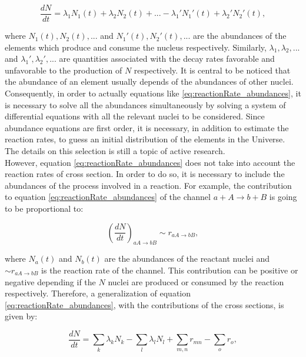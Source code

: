 \documentclass[openany]{book}
\begin{document}
 \begin{equation}\label{eq:reactionRate_abundances}
 	\frac{dN}{dt} = \lambda_1 N_1(t) + \lambda_2 N_2(t)  + ... -  \lambda_1' N_1'(t) + \lambda_2' N_2'(t),
 \end{equation}

where $N_1(t), N_2(t), ...$ and $N_1'(t), N_2'(t), ...$ are the abundances of the elements which produce and consume the nucleus respectively. Similarly,  $\lambda_1, \lambda_2, ...$ and  $\lambda_1', \lambda_2', ...$ are quantities associated with the decay rates favorable and unfavorable to the production of $N$ respectively. It is central to be noticed that the abundance of an element usually depends of the abundances of other nuclei. Consequently, in order to actually equations like \ref{eq:reactionRate_abundances}, it is necessary to solve all the abundances simultaneously by solving a system of differential equations with all the relevant nuclei to be considered. Since abundance equations are first order, it is necessary, in addition to estimate the reaction rates, to guess an initial distribution of the elements in the Universe. The details on this selection is still a topic of active research. \\

However, equation \ref{eq:reactionRate_abundances} does not take into account the reaction rates of cross section. In order to do so, it is necessary to include the abundances of the process involved in a reaction. For example, the contribution to equation \ref{eq:reactionRate_abundances} of the channel $a + A \rightarrow b + B$ is going to be proportional to: 

\begin{equation}
		\left(\frac{dN}{dt}\right)_{aA \rightarrow bB} \sim r_{aA \rightarrow bB},
\end{equation}

where $N_a(t)$ and $N_b(t)$ are the abundances of the reactant nuclei and $ \sim r_{aA \rightarrow bB}$ is the reaction rate of the channel. This contribution can be positive or negative depending if the $N$ nuclei are produced or consumed by the reaction respectively. Therefore, a generalization of equation \ref{eq:reactionRate_abundances}, with the contributions of the cross sections, is given by: 

\begin{equation}\label{eq:reactionRate_abundances_general}
	\frac{dN}{dt} =  \sum_{k} {\lambda_k N_k}  - \sum_{l} {\lambda_l N_l} +  \sum_{m, n} {r_{mn}} - \sum_{o} {r_{o}},
\end{equation}
\end{document}
